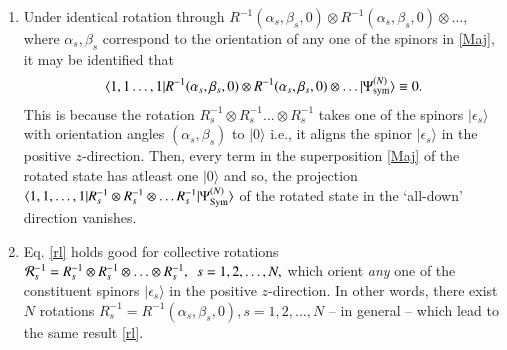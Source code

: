 {\begin{enumerate}
\item Under identical rotation through $R^{-1}(\alpha_s,\beta_s,0)\otimes R^{-1}(\alpha_s,\beta_s,0)\otimes \ldots  $, where $\alpha_s, \beta_s$ correspond to the orientation of any one of the spinors in \eqref{Maj}, it may be identified that 
\begin{equation}
\langle 1,1\ldots , 1\vert R^{-1}(\alpha_s,\beta_s,0)\otimes R^{-1}(\alpha_s,\beta_s,0)\otimes 
\ldots   \vert \Psi^{(N)}_{\rm sym}\rangle\equiv 0.\label{rl}
\end{equation}
This is because the rotation $R_s^{-1}\otimes R_s^{-1}\ldots \otimes R_s^{-1}$ takes one of the spinors $\vert \epsilon_s\rangle$ with orientation angles $(\alpha_s, \beta_s)$ to $\vert 0\rangle$ i.e., it aligns the spinor $\vert \epsilon_s\rangle$ in the positive $z$-direction. Then, every   term in the  superposition \eqref{Maj} of the rotated state has atleast one $\vert 0\rangle$ and so, the projection $\langle 1,1,\ldots, 1\vert R_s^{-1}\otimes R_s^{-1}\otimes \ldots R_s^{-1}\vert \Psi^{(N)}_{\rm Sym}\rangle$ of the rotated state in the `all-down' direction vanishes. 

\item Eq. \eqref{rl} holds good for  collective rotations ${\cal R}_s^{-1}=R^{-1}_s\otimes R^{-1}_s\otimes\ldots\otimes R^{-1}_s,\ \ s=1,2,\ldots, N,$ which orient {\em any} one of the constituent spinors $\vert\epsilon_s\rangle$ in the positive $z$-direction. In other words, there exist $N$ rotations $R^{-1}_s=R^{-1}(\alpha_s,\beta_s,0), s=1,2,\ldots , N$ -- in general -- which lead to the same result  \eqref{rl}.


\end{enumerate}}
